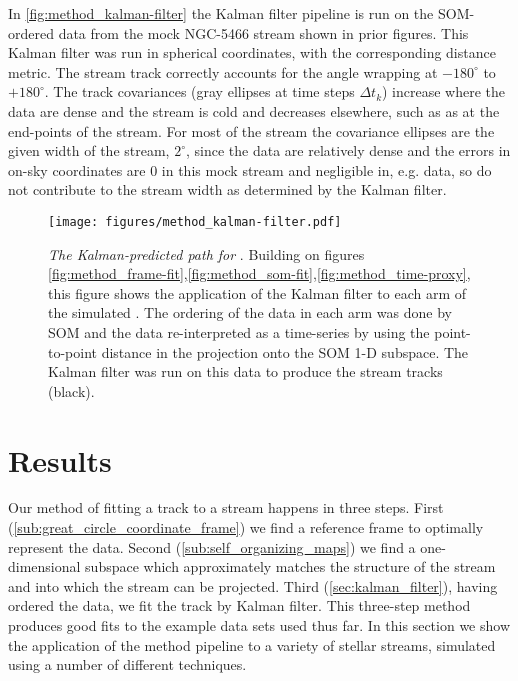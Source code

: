 \documentclass[fleqn,usenatbib]{mnras}
\begin{document}
    In \autoref{fig:method_kalman-filter} the Kalman filter pipeline is run on
    the SOM-ordered data from the mock NGC-5466 stream shown in prior figures.
    This Kalman filter was run in spherical coordinates, with the corresponding
    distance metric. The stream track correctly accounts for the angle wrapping
    at $-180^\circ$ to $+180^\circ$. The track covariances (gray ellipses at
    time steps $\Delta t_k$) increase where the data are dense and the stream is
    cold and decreases elsewhere, such as as at the end-points of the stream.
    For most of the stream the covariance ellipses are the given width of the
    stream, $2^\circ$, since the data are relatively dense and the errors in
    on-sky coordinates are 0 in this mock stream and negligible in, e.g. \gaia{}
    data, so do not contribute to the stream width as determined by the Kalman
    filter.

    \begin{figure}
      \centering
      \texttt{[image: figures/method\_kalman-filter.pdf]}
      \caption{ \emph{The Kalman-predicted path for }. Building
        on figures
        \ref{fig:method_frame-fit},\ref{fig:method_som-fit},\ref{fig:method_time-proxy},
        this figure shows the application of the Kalman filter to each arm of
        the simulated . The ordering of the data in each arm
        was done by SOM and the data re-interpreted as a time-series by using
        the point-to-point distance in the projection onto the SOM 1-D subspace.
        The Kalman filter was run on this data to produce the stream tracks
        (black). }
      \label{fig:method_kalman-filter}
    \end{figure}




\section{Results} \label{sec:results}

  Our method of fitting a track to a stream happens in three steps. First
  (\autoref{sub:great_circle_coordinate_frame}) we find a reference frame to
  optimally represent the data. Second (\autoref{sub:self_organizing_maps}) we
  find a one-dimensional subspace which approximately matches the structure of
  the stream and into which the stream can be projected. Third
  (\autoref{sec:kalman_filter}), having ordered the data, we fit the track by
  Kalman filter. This three-step method produces good fits to the example data
  sets used thus far. In this section we show the application of the method
  pipeline to a variety of stellar streams, simulated using a number of
  different techniques.
\end{document}
